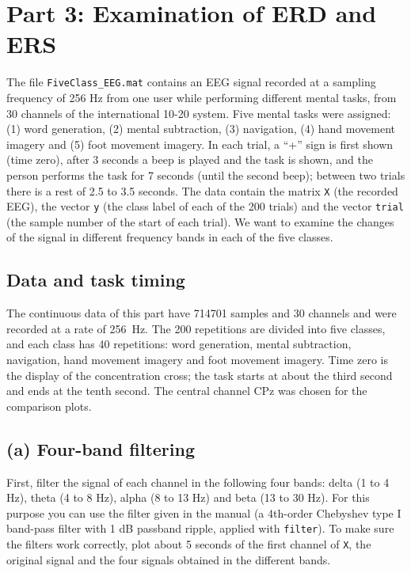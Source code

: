 \section{Part 3: Examination of ERD and ERS}

\begin{taskbox}
The file \texttt{FiveClass\_EEG.mat} contains an EEG signal recorded at a sampling frequency of 256 Hz from one user while performing different mental tasks, from 30 channels of the international 10-20 system. Five mental tasks were assigned: (1) word generation, (2) mental subtraction, (3) navigation, (4) hand movement imagery and (5) foot movement imagery. In each trial, a ``+'' sign is first shown (time zero), after 3 seconds a beep is played and the task is shown, and the person performs the task for 7 seconds (until the second beep); between two trials there is a rest of 2.5 to 3.5 seconds. The data contain the matrix \texttt{X} (the recorded EEG), the vector \texttt{y} (the class label of each of the 200 trials) and the vector \texttt{trial} (the sample number of the start of each trial). We want to examine the changes of the signal in different frequency bands in each of the five classes.
\end{taskbox}

\subsection*{Data and task timing}

The continuous data of this part have 714701 samples and 30 channels and were recorded at a rate of 256~Hz. The 200 repetitions are divided into five classes, and each class has 40 repetitions: word generation, mental subtraction, navigation, hand movement imagery and foot movement imagery. Time zero is the display of the concentration cross; the task starts at about the third second and ends at the tenth second. The central channel CPz was chosen for the comparison plots.

\subsection*{(a) Four-band filtering}
\begin{taskbox}
First, filter the signal of each channel in the following four bands: delta (1 to 4 Hz), theta (4 to 8 Hz), alpha (8 to 13 Hz) and beta (13 to 30 Hz). For this purpose you can use the filter given in the manual (a 4th-order Chebyshev type I band-pass filter with 1 dB passband ripple, applied with \texttt{filter}). To make sure the filters work correctly, plot about 5 seconds of the first channel of \texttt{X}, the original signal and the four signals obtained in the different bands.
\end{taskbox}

